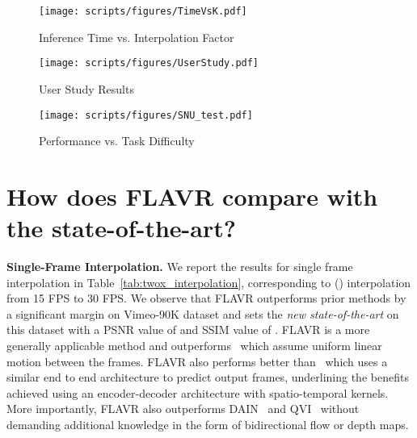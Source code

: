 \documentclass[10pt,twocolumn,letterpaper]{article}
\newcommand{\tabref}[1]{Table~\ref{#1}}
\newcommand{\Ours}{FLAVR}
\newcommand{\twox}{}
\begin{document}
\begin{table*}[!t]
\begin{figure*}
     \centering
     \begin{subfigure}[t]{0.32\textwidth}
        \centering
        \texttt{[image: scripts/figures/TimeVsK.pdf]}
        \caption{Inference Time vs. Interpolation Factor}
        \label{fig:TimeVsK}
     \end{subfigure}
     \hfill
     \begin{subfigure}[t]{0.32\textwidth}
        \centering
        \texttt{[image: scripts/figures/UserStudy.pdf]}
        \caption{User Study Results}
        \label{fig:userStudy}
     \end{subfigure}
     \hfill
     \begin{subfigure}[t]{0.32\textwidth}
        \centering
        \texttt{[image: scripts/figures/SNU\_test.pdf]}
        \captionsetup{width=\textwidth}
        \caption{Performance vs. Task Difficulty}
        \label{fig:SNUTest}
     \end{subfigure}
\vspace{-2pt}
\caption{{\bf Analysis}. (a) Inference time (forward pass w/o IO) of different methods on different interpolation factor. \Ours{} has almost no change in inference time due to its design to predict multiple frames per inference. (b) Comparison between \Ours{} with Super-SloMo and QVI in a user study on DAVIS. \Ours{} significantly outperforms Super-SloMo, and performs comparable to QVI. (c) Comparison between \Ours{} with other methods on SNU-Film dataset. \Ours{} consistently outperforms all comparing methods across all levels of task difficulty.}
\vspace{-12pt}
\label{fig:analysis}
\end{figure*} 

\section{How does \Ours{} compare with the state-of-the-art?}
\label{sec:state-of-the-art}

{\bf Single-Frame Interpolation.} We report the results for single frame interpolation in \tabref{tab:twox_interpolation}, corresponding to \twox{}() interpolation from 15 FPS to 30 FPS. We observe that \Ours{} outperforms prior methods by a significant margin on Vimeo-90K dataset and sets the \textit{new state-of-the-art} on this dataset with a PSNR value of 
 and SSIM value of . \Ours{} is a more generally applicable method and outperforms~\cite{jiang2018super, liu2017video, niklaus2017video} which assume uniform linear motion between the frames. 
\Ours{} also performs better than~\cite{choi2020channel} which uses a similar end to end architecture to predict output frames, underlining the benefits achieved using an encoder-decoder architecture with spatio-temporal kernels. More importantly, \Ours{} also outperforms DAIN~\cite{bao2019depth} and QVI~\cite{xu2019quadratic} without demanding additional knowledge in the form of bidirectional flow or depth maps.



\end{table*}
\end{document}
